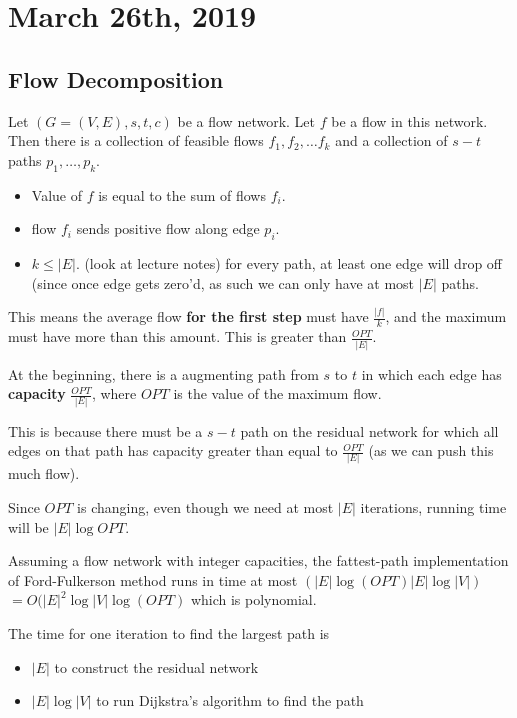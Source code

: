 \documentclass[../main/main.tex]{subfiles}
\begin{document}
\section{March 26th, 2019}
\subsection{Flow Decomposition}
\begin{lemma}
	Let $\left( G=(V,E),s,t,c \right) $ be a flow network. Let $f$ be a flow in this network. Then there is a collection of feasible flows  $f_1,f_2,\ldots f_k$ and a collection of $s-t$ paths $p_1,\ldots,p_k$.
\end{lemma}
\begin{itemize}
	\item Value of $f$ is equal to the sum of flows $f_i$.
	\item flow $f_i$ sends positive flow along edge $p_i$.
	\item  $k\le |E|$. (look at lecture notes) for every path, at least one edge will drop off (since once edge gets zero'd, as such we can only have at most $|E|$ paths.
\end{itemize}

This means the average flow \textbf{for the first step} must have $\frac{|f|}{k}$, and the maximum must have more than this amount. This is greater than $\frac{OPT}{|E|}$.

\begin{corollary}
	\label{begMinEdgeCap}
	At the beginning, there is a augmenting path from $s$ to $t$ in which each edge has \textbf{capacity} $\frac{OPT}{|E|}$, where $OPT$ is the value of the maximum flow.
\end{corollary}

This is because there must be a $s-t$ path on the residual network for which all edges on that path has capacity greater than equal to $\frac{OPT}{|E|}$ (as we can push this much flow). 

Since $OPT$ is changing, even though we need at most $|E|$ iterations, running time will be $|E|\log OPT$.

 \begin{theorem}
	 Assuming a flow network with integer capacities, the fattest-path implementation of Ford-Fulkerson method runs in time at most $\left( |E|\log \left( OPT \right) |E|\log |V| \right)$\\$=O(|E|^2\log |V| \log (OPT) $ which is polynomial.
\end{theorem}
The time for one iteration to find the largest path is
\begin{itemize}
	\item $|E|$ to construct the residual network
	\item $|E|\log |V|$ to run Dijkstra's algorithm to find the path 
\end{itemize}
\end{document}
